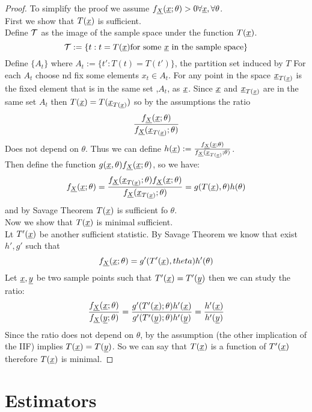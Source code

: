 \begin{proof}
	To simplify the proof we assume $f_{\underline X}(\underline{x};\theta) > 0 \forall \underline x, \forall \theta$.\\
	First we show that $T(\underline x)$ is sufficient.\\
	Define $\mathcal{T}$ as the image of the sample space under the function $T(\underline{x})$.
	$$\mathcal{T}:=\{ t:t=T(\underline{x}) \text{for some $\underline x$ in the sample space} \}$$
	Define $\{ A_t\} $ where $A_t:=\{t' : T(t)=T(t') \}$, the partition set induced by $T$
	For each $A_t$  choose nd fix some elements $x_t\in A_t$. For any point in the space $\underline x_{T(\underline{x})}$ is the fixed element that is in the same set ,$A_t$, as $\underline x$. Since $\underline x$ and $\underline x_{T(\underline{x})}$ are in the same set $A_t$ then $T(\underline{x})=T(\underline x_{T(\underline{x})})$ so by the assumptions the ratio
	\[
	\frac{f_{\underline X}(\underline{x};\theta)}{f_{\underline X}(\underline x_{T(\underline{x})};\theta)}
	\]
Does not depend on $\theta$. Thus we can define $h(\underline x):=\frac{f_{\underline X}(\underline{x};\theta)}{f_{\underline X}(\underline x_{T(\underline{x})};\theta)}$.\\
Then define the function $g(\underline x,\theta)f_{\underline X}(\underline{x};\theta)$, so we have:
\[
f_{\underline X}(\underline{x};\theta) =\frac{f_{\underline X}(\underline x_{T(\underline{x})};\theta)f_{\underline X}(\underline{x};\theta)}{f_{\underline X}(\underline x_{T(\underline{x})};\theta)}=g(T(\underline x),\theta) h(\theta)
\]
and by Savage Theorem $T(\underline{x})$ is sufficient fo $\theta$.\\


Now we show that $T(\underline{x})$ is minimal sufficient.\\
Lt  $T'(\underline x)$ be another sufficient statistic. By Savage Theorem we know that exist $h',g'$ such that
\[
f_{\underline X}(\underline{x};\theta)=g'(T'(\underline x),theta)h'(\theta)
\]
Let $\underline x,\underline y$ be two sample points such that $T'(\underline x)=T'(\underline y)$ then we can study the ratio:
\[
\frac{f_{\underline X}(\underline{x};\theta)}{f_{\underline X}(\underline y;\theta)}=\frac{g'(T'(\underline x);\theta)h'(\underline x)}{g'(T'(\underline y);\theta)h'(\underline y)}=\frac{h'(\underline x)}{h'(\underline y)}
\]
Since the ratio does not depend on $\theta$, by the assumption (the other implication of the IIF) implies $T(\underline{x}) =T(\underline y)$. So we can say that $T(\underline x)$ is a function of $T'(\underline x)$ therefore $T(\underline{x})$ is minimal.
\end{proof}
\section{Estimators}

